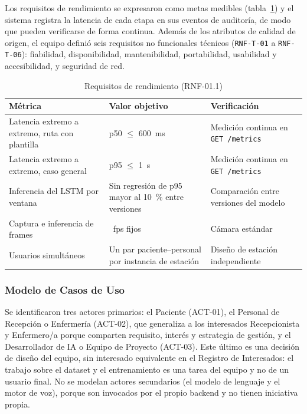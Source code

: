 Los requisitos de rendimiento se expresaron como metas medibles (tabla~\ref{tab:rendimiento}) y el sistema registra la latencia de cada etapa en sus eventos de auditoría, de modo que pueden verificarse de forma continua. Además de los atributos de calidad de origen, el equipo definió seis requisitos no funcionales técnicos (\texttt{RNF-T-01} a \texttt{RNF-T-06}): fiabilidad, disponibilidad, mantenibilidad, portabilidad, usabilidad y accesibilidad, y seguridad de red.

\begin{table}[H]
  \centering
  \caption{Requisitos de rendimiento (RNF-01.1)}\label{tab:rendimiento}
  \small
  \begin{tabularx}{\textwidth}{>{\raggedright\arraybackslash}p{7.2cm} >{\raggedright\arraybackslash}p{3.4cm} X}
    \toprule
    \textbf{Métrica} & \textbf{Valor objetivo} & \textbf{Verificación} \\
    \midrule
    Latencia extremo a extremo, ruta con plantilla & p50 $\leq$ 600~ms & Medición continua en \texttt{GET /metrics} \\
    Latencia extremo a extremo, caso general & p95 $\leq$ 1~s & Medición continua en \texttt{GET /metrics} \\
    Inferencia del LSTM por ventana & Sin regresión de p95 mayor al 10~\% entre versiones & Comparación entre versiones del modelo \\
    Captura e inferencia de frames & 20~fps fijos & Cámara estándar \\
    Usuarios simultáneos & Un par paciente--personal por instancia de estación & Diseño de estación independiente \\
    \bottomrule
  \end{tabularx}
\end{table}

\subsubsection{Modelo de Casos de Uso}

Se identificaron tres actores primarios: el Paciente (ACT-01), el Personal de Recepción o Enfermería (ACT-02), que generaliza a los interesados Recepcionista y Enfermero/a porque comparten requisito, interés y estrategia de gestión, y el Desarrollador de IA o Equipo de Proyecto (ACT-03). Este último es una decisión de diseño del equipo, sin interesado equivalente en el Registro de Interesados: el trabajo sobre el dataset y el entrenamiento es una tarea del equipo y no de un usuario final. No se modelan actores secundarios (el modelo de lenguaje y el motor de voz), porque son invocados por el propio backend y no tienen iniciativa propia.

